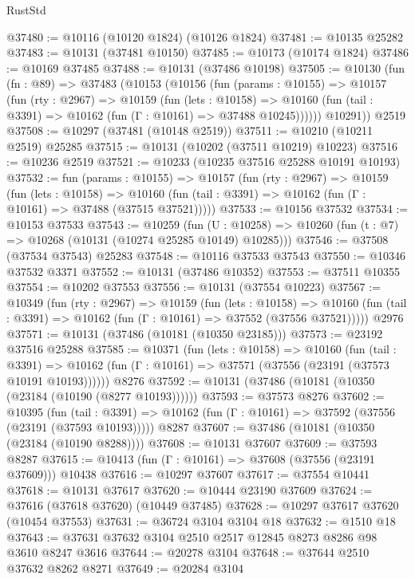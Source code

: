 \begin{lexlean}{RustStd}
\begin{coremodule}
@37480 := @10116 (@10120 @1824) (@10126 @1824)
@37481 := @10135 @25282
@37483 := @10131 (@37481 @10150)
@37485 := @10173 (@10174 @1824)
@37486 := @10169 @37485
@37488 := @10131 (@37486 @10198)
@37505 := @10130
    (fun (fn : @89) =>
    @37483
      (@10153
        (@10156
          (fun (params : @10155) =>
          @10157
            (fun (rty : @2967) =>
            @10159
              (fun (lets : @10158) =>
              @10160 (fun (tail : @3391) => @10162 (fun (Γ : @10161) => @37488 @10245))))))
        @10291))
    @2519
@37508 := @10297 (@37481 (@10148 @2519))
@37511 := @10210 (@10211 @2519) @25285
@37515 := @10131 (@10202 (@37511 @10219) @10223)
@37516 := @10236 @2519
@37521 := @10233 (@10235 @37516 @25288 @10191 @10193)
@37532 := fun (params : @10155) =>
  @10157
    (fun (rty : @2967) =>
    @10159
      (fun (lets : @10158) =>
      @10160 (fun (tail : @3391) => @10162 (fun (Γ : @10161) => @37488 (@37515 @37521)))))
@37533 := @10156 @37532
@37534 := @10153 @37533
@37543 := @10259
    (fun (U : @10258) => @10260 (fun (t : @7) => @10268 (@10131 (@10274 @25285 @10149) @10285)))
@37546 := @37508 (@37534 @37543) @25283
@37548 := @10116 @37533 @37543
@37550 := @10346 @37532 @3371
@37552 := @10131 (@37486 @10352)
@37553 := @37511 @10355
@37554 := @10202 @37553
@37556 := @10131 (@37554 @10223)
@37567 := @10349
    (fun (rty : @2967) =>
    @10159
      (fun (lets : @10158) =>
      @10160 (fun (tail : @3391) => @10162 (fun (Γ : @10161) => @37552 (@37556 @37521)))))
    @2976
@37571 := @10131 (@37486 (@10181 (@10350 @23185)))
@37573 := @23192 @37516 @25288
@37585 := @10371
    (fun (lets : @10158) =>
    @10160
      (fun (tail : @3391) =>
      @10162 (fun (Γ : @10161) => @37571 (@37556 (@23191 (@37573 @10191 @10193))))))
    @8276
@37592 := @10131 (@37486 (@10181 (@10350 (@23184 (@10190 (@8277 @10193))))))
@37593 := @37573 @8276
@37602 := @10395
    (fun (tail : @3391) => @10162 (fun (Γ : @10161) => @37592 (@37556 (@23191 (@37593 @10193)))))
    @8287
@37607 := @37486 (@10181 (@10350 (@23184 (@10190 @8288))))
@37608 := @10131 @37607
@37609 := @37593 @8287
@37615 := @10413 (fun (Γ : @10161) => @37608 (@37556 (@23191 @37609))) @10438
@37616 := @10297 @37607
@37617 := @37554 @10441
@37618 := @10131 @37617
@37620 := @10444 @23190 @37609
@37624 := @37616 (@37618 @37620) (@10449 @37485)
@37628 := @10297 @37617 @37620 (@10454 @37553)
@37631 := @36724 @3104 @3104 @18
@37632 := @1510 @18
@37643 := @37631 @37632 @3104 @2510 @2517 @12845 @8273 @8286 @98 @3610 @8247 @3616
@37644 := @20278 @3104
@37648 := @37644 @2510 @37632 @8262 @8271
@37649 := @20284 @3104

\end{coremodule}
\end{lexlean}
